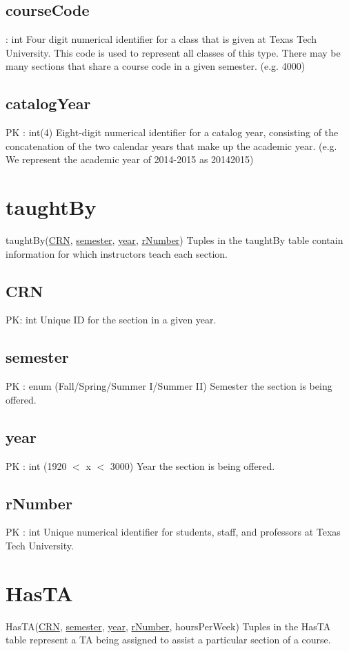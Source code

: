 	\subsection{courseCode}
		: int
		Four digit numerical identifier for a class that is given at Texas Tech University. This code is used to represent all classes of this type. There may be many sections that share a course code in a given semester. (e.g. 4000)
	
	\subsection{catalogYear}
		PK : int(4) 
		Eight-digit numerical identifier for a catalog year, consisting of the concatenation of the two calendar years that make up the academic year. (e.g. We represent the academic year of 2014-2015 as 20142015)


\section{taughtBy}
	taughtBy(\underline{CRN}, \underline{semester}, \underline{year}, \underline{rNumber}) 
		Tuples in the taughtBy table contain information for which instructors teach each section.
 	
 	\subsection{CRN}
		PK: int 
		Unique ID for the section in a given year.
		
	\subsection{semester}
		PK : enum (Fall/Spring/Summer I/Summer II)
		Semester the section is being offered.
	
	\subsection{year}
		PK : int (1920 $<$ x $<$ 3000) 
		Year the section is being offered.
	
	\subsection{rNumber}
		PK : int
		Unique numerical identifier for students, staff, and professors at Texas Tech University.


\section{HasTA}
	HasTA(\underline{CRN}, \underline{semester}, \underline{year}, \underline{rNumber}, hoursPerWeek) 
		Tuples in the HasTA table represent a TA being assigned to assist a particular section of a course.
	

